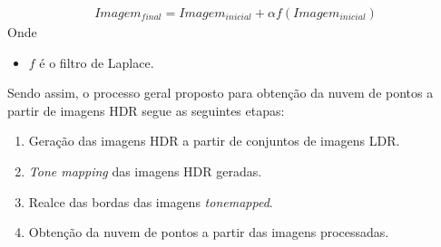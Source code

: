 \begin{align} \label{eqPontosLaplaceSoma}
	Imagem_{final} = Imagem_{inicial} + \alpha f(Imagem_{inicial})
\end{align}
Onde
\begin{itemize}
\item $f$ é o filtro de Laplace.
\end{itemize}

  Sendo assim, o processo geral proposto para obtenção da nuvem de pontos a partir de imagens HDR segue as seguintes etapas:

\begin{enumerate}
\item Geração das imagens HDR a partir de conjuntos de imagens LDR.
\item \textit{Tone mapping} das imagens HDR geradas.
\item Realce das bordas das imagens \textit{tonemapped}.
\item Obtenção da nuvem de pontos a partir das imagens processadas.
\end{enumerate}